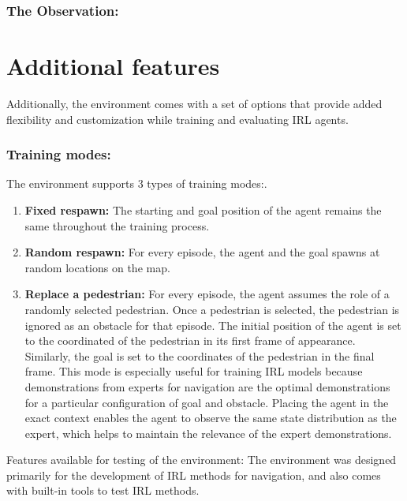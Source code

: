 \subsubsection{The Observation:}
\section{Additional features}
Additionally, the environment comes with a set of options that provide added flexibility and customization while training and evaluating IRL agents.
\subsubsection{Training modes:}
The environment supports 3 types of training modes:. 
\begin{enumerate}
    \item \textbf{Fixed respawn:} The starting and goal position of the agent remains the same throughout the training process.
    \item \textbf{Random respawn:} For every episode, the agent and the goal spawns at random locations on the map. 
    \item \textbf{Replace a pedestrian:} For every episode, the agent assumes the role of a randomly selected pedestrian. Once a pedestrian is selected, the pedestrian is ignored as an obstacle for that episode. The initial position of the agent is set to the coordinated of the pedestrian in its first frame of appearance. Similarly, the goal is set to the coordinates of the pedestrian in the final frame.
    This mode is especially useful for training IRL models because demonstrations from experts for navigation are the optimal demonstrations for a particular configuration of goal and obstacle. Placing the agent in the exact context enables the agent to observe the same state distribution as the expert, which helps to maintain the relevance of the expert demonstrations. 
\end{enumerate}
Features available for testing of the environment:
The environment was designed primarily for the development of IRL methods for navigation, and also comes with built-in tools to test IRL methods.
